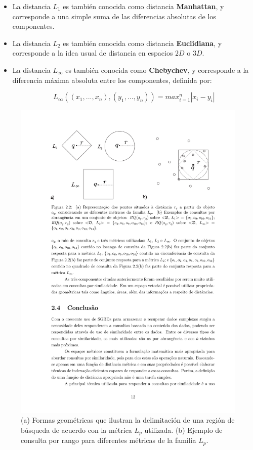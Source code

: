 \begin{itemize}

\item La distancia $L_1$ es también conocida como distancia \textbf{Manhattan}, y corresponde a una  simple suma de las diferencias absolutas de los componentes.

\item La distancia $L_2$ es también conocida como distancia \textbf{Euclidiana}, y corresponde a la idea usual de distancia en espacios $2D$ o $3D$.

\item La distancia $L_{\infty}$ es también conocida como \textbf{Chebychev}, y corresponde a la diferencia máxima absoluta entre los componentes, definida por:

\begin{equation}
   L_{\infty} ((x_1,...,x_n), (y_1,...,y_n)) = max_{i=1}^{n} |x_i - y_i|
\end{equation}

\end{itemize}

\begin{figure}[htp]
\centering
\includegraphics[width=0.9\columnwidth]{chapter2/lpnorms.pdf}
\caption{(a) Formas geométricas que ilustran la delimitación de una  región de búsqueda de acuerdo con la métrica $L_p$ utilizada. (b) Ejemplo de consulta por rango para diferentes métricas de la  familia $L_p$.}
\label{fig:lpnorms}
\end{figure}

